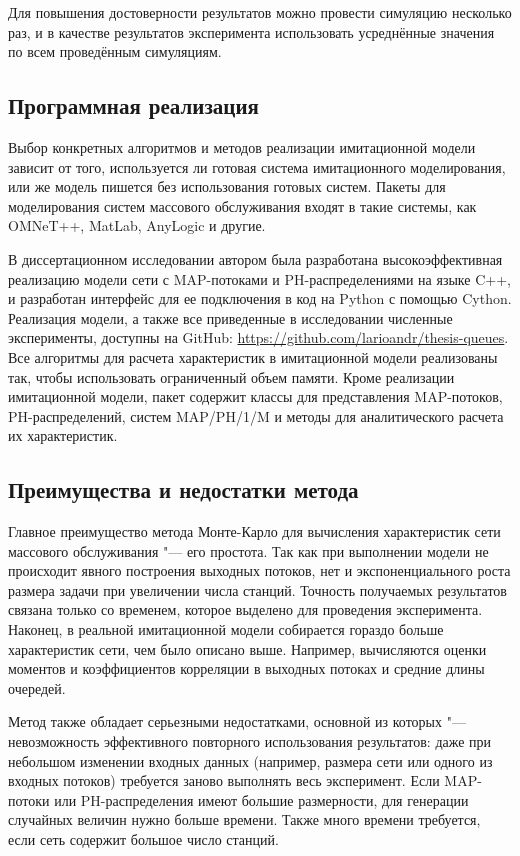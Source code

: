 Для повышения достоверности результатов можно провести симуляцию несколько раз, и в качестве результатов эксперимента использовать усреднённые значения по всем проведённым симуляциям.



\subsection{Программная реализация}

Выбор конкретных алгоритмов и методов реализации имитационной модели зависит от того, используется ли готовая система имитационного моделирования, или же модель пишется без использования готовых систем. Пакеты для моделирования систем массового обслуживания входят в такие системы, как OMNeT++, MatLab, AnyLogic и другие.

В диссертационном исследовании автором была разработана высокоэффективная реализацию модели сети с MAP-потоками и PH-распределениями на языке C++, и разработан интерфейс для ее подключения в код на Python с помощью Cython. Реализация модели, а также все приведенные в исследовании численные эксперименты, доступны на GitHub: \url{https://github.com/larioandr/thesis-queues}. Все алгоритмы для расчета характеристик в имитационной модели реализованы так, чтобы использовать ограниченный объем памяти. Кроме реализации имитационной модели, пакет содержит классы для представления MAP-потоков, PH-распределений, систем MAP/PH/1/M и методы для аналитического расчета их характеристик.


\subsection{Преимущества и недостатки метода}
Главное преимущество метода Монте-Карло для вычисления характеристик сети массового обслуживания "--- его простота. Так как при выполнении модели не происходит явного построения выходных потоков, нет и экспоненциального роста размера задачи при увеличении числа станций. Точность получаемых результатов связана только со временем, которое выделено для проведения эксперимента. Наконец, в реальной имитационной модели собирается гораздо больше характеристик сети, чем было описано выше. Например, вычисляются оценки моментов и коэффициентов корреляции в выходных потоках и средние длины очередей.

Метод также обладает серьезными недостатками, основной из которых "--- невозможность эффективного повторного использования результатов: даже при небольшом изменении входных данных (например, размера сети или одного из входных потоков) требуется заново выполнять весь эксперимент. Если MAP-потоки или PH-распределения имеют большие размерности, для генерации случайных величин нужно больше времени. Также много времени требуется, если сеть содержит большое число станций.

